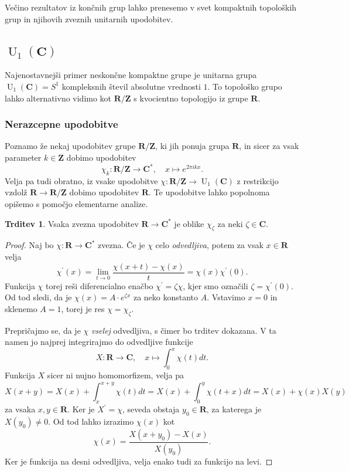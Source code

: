 \documentclass[11pt]{book}
\def\ZZ{\mathbf{Z}}
\def\RR{\mathbf{R}}
\def\CC{\mathbf{C}}
\DeclareMathOperator\U{U}
\theoremstyle{definition}
\theoremstyle{zgled}
\theoremstyle{zgledbrezstevilke}
\theoremstyle{odprtproblem}
\theoremstyle{domacanaloga}
\newenvironment{dokaz}
    {\color{siva}\begin{proof}}
    {\end{proof}}
\theoremstyle{izrek}
\newtheorem{trditev}[theorem]{Trditev}
\begin{document}
Večino rezultatov iz končnih grup lahko prenesemo v svet kompaktnih topoloških grup in njihovih zveznih unitarnih upodobitev.

\subsection{$\U_1(\CC)$}

Najenostavnejši primer neskončne kompaktne grupe je unitarna grupa $\U_1(\CC) = S^1$ kompleksnih števil absolutne vrednosti $1$. To topološko grupo lahko alternativno vidimo kot $\RR/\ZZ$ s kvocientno topologijo iz grupe $\RR$. 

\subsubsection{Nerazcepne upodobitve}

Poznamo že nekaj upodobitev grupe $\RR/\ZZ$, ki jih ponuja grupa $\RR$, in sicer za vsak parameter $k \in \ZZ$ dobimo upodobitev
\[
    \chi_k \colon \RR/\ZZ \to \CC^*, \quad
    x \mapsto e^{2 \pi i k x}.
\]
Velja pa tudi obratno, iz vsake upodobitve $\chi \colon \RR/\ZZ \to \U_1(\CC)$ z restrikcijo vzdolž $\RR \to \RR/\ZZ$ dobimo upodobitev $\RR$. Te upodobitve lahko popolnoma opišemo s pomočjo elementarne analize.

\begin{trditev}
Vsaka zvezna upodobitev $\RR \to \CC^*$ je oblike $\chi_{\zeta}$ za neki $\zeta \in \CC$.
\end{trditev}
\begin{dokaz}
Naj bo $\chi \colon \RR \to \CC^*$ zvezna. Če je $\chi$ celo \emph{odvedljiva}, potem za vsak $x \in \RR$ velja
\[
    \chi^\prime(x) 
    = \lim_{t \to 0} \frac{\chi(x + t) - \chi(x)}{t}
    = \chi(x) \chi^\prime(0).
\]
Funkcija $\chi$ torej reši diferencialno enačbo $\chi^\prime = \zeta \chi$, kjer smo označili $\zeta = \chi^\prime(0)$. Od tod sledi, da je $\chi(x) = A \cdot e^{\zeta x}$ za neko konstanto $A$. Vstavimo $x = 0$ in sklenemo $A = 1$, torej je res $\chi = \chi_{\zeta}$.

Prepričajmo se, da je $\chi$ \emph{vselej} odvedljiva, s čimer bo trditev dokazana. V ta namen jo najprej integrirajmo do odvedljive funkcije
\[
    X \colon \RR \to \CC, \quad 
    x \mapsto \int_{0}^{x} \chi(t) dt.
\]
Funkcija $X$ sicer ni nujno homomorfizem, velja pa
\[
    X(x + y)
    = X(x) + \int_{x}^{x+y} \chi(t) dt
    = X(x) + \int_{0}^{y} \chi(t+x) dt
    = X(x) + \chi(x) X(y)
\]
za vsaka $x,y \in \RR$. Ker je $X^\prime = \chi$, seveda obstaja $y_0 \in \RR$, za katerega je $X(y_0) \neq 0$. Od tod lahko izrazimo $\chi(x)$ kot
\[
    \chi(x) = \frac{X(x+y_0) - X(x)}{X(y_0)}.
\] 
Ker je funkcija na desni odvedljiva, velja enako tudi za funkcijo na levi.
\end{dokaz}
\end{document}
